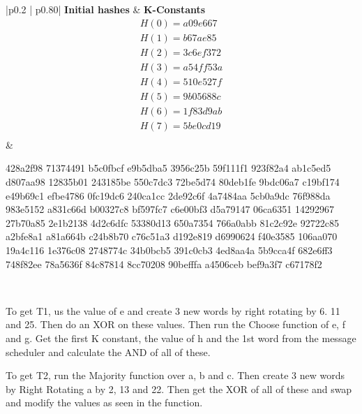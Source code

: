         \begin{table}[h!]
        \caption{Initial hashes and K-Constants}
        \centering
        \begin{tabular}{{|p{0.2\textwidth} | p{0.80\textwidth}|}}
          \hline
         \textbf{Initial hashes} & \textbf{K-Constants} \\
         \hline\hline
            \begin{gather*}
                H(0) = a09e667 \\
                H(1) = b67ae85 \\
                H(2) = 3c6ef372\\
                H(3) = a54ff53a\\
                H(4) = 510e527f\\
                H(5) = 9b05688c\\
                H(6) = 1f83d9ab\\
                H(7) = 5be0cd19\\
            \end{gather*}
             &  \rule{0pt}{4ex}
                \begin{justify}
                   428a2f98 71374491 b5c0fbcf e9b5dba5 3956c25b 59f111f1 923f82a4 ab1c5ed5 d807aa98 12835b01 243185be 550c7dc3 72be5d74 80deb1fe 9bdc06a7 c19bf174 e49b69c1 efbe4786 0fc19dc6 240ca1cc 2de92c6f 4a7484aa 5cb0a9dc 76f988da 983e5152 a831c66d b00327c8 bf597fc7 c6e00bf3 d5a79147 06ca6351 14292967 27b70a85 2e1b2138 4d2c6dfc 53380d13 650a7354 766a0abb 81c2c92e 92722c85 a2bfe8a1 a81a664b c24b8b70 c76c51a3 d192e819 d6990624 f40e3585 106aa070 19a4c116 1e376c08 2748774c 34b0bcb5 391c0cb3 4ed8aa4a 5b9cca4f 682e6ff3 748f82ee 78a5636f 84c87814 8cc70208 90befffa a4506ceb bef9a3f7 c67178f2  
                 \end{justify}\\
        \hline
        \end{tabular}
        \label{tab:Initial hashes and K-Constants}
        \end{table}
        
        To get T1, us the value of e and create 3 new words by right rotating by 6. 11 and 25. Then do an XOR on these values. Then run the Choose function of e, f and g. Get the first K constant, the value of h and the 1st word from the message scheduler and calculate the AND of all of these. 
        
        To get T2, run the Majority function over a, b and c. Then create 3 new words by Right Rotating a by 2, 13 and 22. Then get the XOR of all of these and swap and modify the values as seen in the function.  
        
